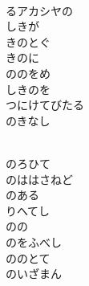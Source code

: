 \documentclass[10pt,b5j]{tarticle} %
\begin{document}
\begin{enumerate}
\begin{minipage}[c]{\blocksize}
        \vspace{\linespace}
        \item~\\
        るアカシヤの\\
        しきが\\
        きのとぐ\\
        きのに\\
        ののをめ\\
        しきのを\\
        つにけてびたる\\
        のきなし
        
    \end{minipage}
    \begin{minipage}[c]{\blocksize}
        
        \vspace{\linespace}
        \item~\\
        のろひて\\
        のははさねど\\
        のある\\
        りへてし\\
        のの\\
        のをふべし\\
        ののとて\\
        のいざまん
    
    \end{minipage}
\end{enumerate} %
\end{document}
